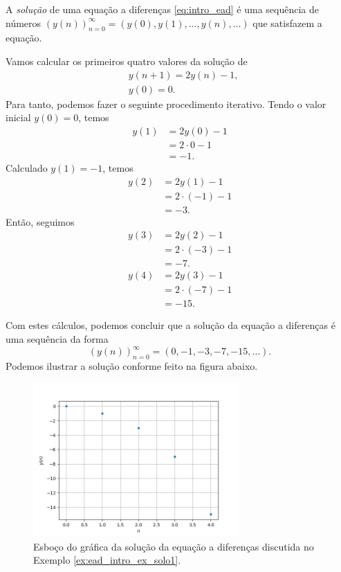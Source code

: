 A \emph{solução} de uma equação a diferenças \eqref{eq:intro_ead} é uma sequência de números $\left(y(n)\right)_{n=0}^\infty = \left(y(0), y(1), \dotsc, y(n), \ldots\right)$ que satisfazem a equação.

\begin{ex}\label{ex:ead_intro_ex_solo1}
  Vamos calcular os primeiros quatro valores da solução de
  \begin{align}
    &y(n+1) = 2y(n) - 1,\\
    &y(0)=0.
  \end{align}
  Para tanto, podemos fazer o seguinte procedimento iterativo. Tendo o valor inicial $y(0)=0$, temos
  \begin{align}
    y(1) &= 2y(0) - 1\\
    &= 2\cdot 0 - 1\\
    &= -1.
  \end{align}
  Calculado $y(1)=-1$, temos
  \begin{align}
    y(2) &= 2y(1) - 1\\
    &= 2\cdot (-1) - 1\\
    &= -3.
  \end{align}
  Então, seguimos
  \begin{align}
    y(3) &= 2y(2) - 1\\
    &= 2\cdot (-3) - 1\\
    &= -7.\\
    y(4) &= 2y(3) - 1\\
    &= 2\cdot (-7) - 1\\
    &= -15.
  \end{align}

  Com estes cálculos, podemos concluir que a solução da equação a diferenças é uma sequência da forma
  \begin{equation}
    (y(n))_{n=0}^\infty = (0, -1, -3, -7, -15, \ldots).
  \end{equation}
  Podemos ilustrar a solução conforme feito na figura abaixo.

  \begin{figure}[H]
    \centering
    \includegraphics[width=0.7\textwidth]{cap_intro/dados/fig_ead1_intro_ex_solo1/fig.png}
    \caption{Esboço do gráfica da solução da equação a diferenças discutida no Exemplo \ref{ex:ead_intro_ex_solo1}.}
    \label{fig:ead1_intro_ex_solo1}
  \end{figure}
\end{ex}

